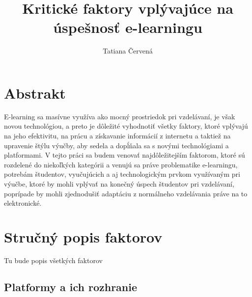 \documentclass[12pt]{article}
\title{Kritické faktory vplývajúce na úspešnosť e-learningu}
\author{Tatiana Červená}
\begin{document}
\maketitle
\section*{Abstrakt}
E-learning sa masívne využíva ako mocný prostriedok pri vzdelávaní, je však novou technológiou, a preto je dôležité vyhodnotiť všetky faktory, ktoré vplývajú na jeho efektivitu, na prácu a získavanie informácií z internetu a taktiež na upravenie štýlu výučby, aby sedela a dopĺňala sa s novými technológiami a platformami. V tejto práci sa budem venovať najdôležitejším faktorom, ktoré sú rozdelené do niekoľkých kategórii a venujú sa práve problematike e-learningu, potrebám študentov, vyučujúcich a aj technologickým prvkom využívaným pri výučbe, ktoré by mohli vplývať na konečný úspech študentov pri vzdelávaní, poprípade by mohli zjednodušiť adaptáciu z normálneho vzdelávania práve na to elektronické.
\section{Stručný popis faktorov}
Tu bude popis všetkých faktorov
\subsection{Platformy a ich rozhranie}
\end{document}
